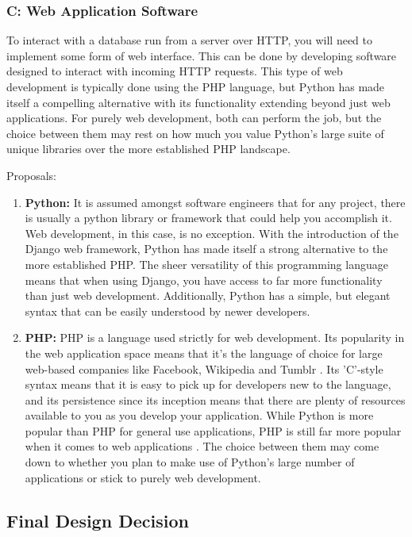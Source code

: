 \subsubsection{C: Web Application Software}

To interact with a database run from a server over HTTP, you will need to implement some form of web interface. This can be done by developing software designed to interact with incoming HTTP requests. This type of web development is typically done using the PHP language, but Python has made itself a compelling alternative with its functionality extending beyond just web applications. For purely web development, both can perform the job, but the choice between them may rest on how much you value Python's large suite of unique libraries over the more established PHP landscape.

Proposals:

\begin{enumerate}
    \item \textbf{Python:} It is assumed amongst software engineers that for any project, there is usually a python library or framework that could help you accomplish it. Web development, in this case, is no exception. With the introduction of the Django web framework, Python has made itself a strong alternative to the more established PHP. The sheer versatility of this programming language means that when using Django, you have access to far more functionality than just web development. Additionally, Python has a simple, but elegant syntax that can be easily understood by newer developers. 
    \item \textbf{PHP:} PHP is a language used strictly for web development. Its popularity in the web application space means that it's the language of choice for large web-based companies like Facebook, Wikipedia and Tumblr \cite{ThePHPGroup}. Its 'C'-style syntax means that it is easy to pick up for developers new to the language, and its persistence since its inception means that there are plenty of resources available to you as you develop your application. While Python is more popular than PHP for general use applications, PHP is still far more popular when it comes to web applications \cite{ThePHPGroup}. The choice between them may come down to whether you plan to make use of Python's large number of applications or stick to purely web development.
\end{enumerate}

\subsection{Final Design Decision}

